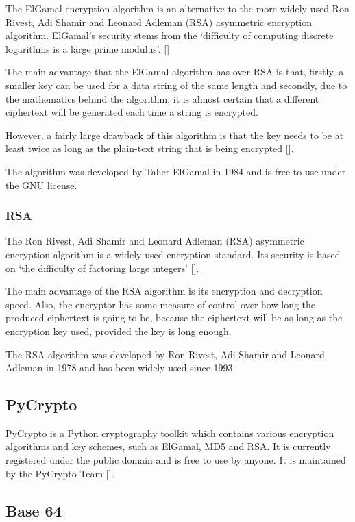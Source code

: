 The ElGamal encryption algorithm is an alternative to the more widely used  Ron Rivest, Adi
Shamir and Leonard Adleman (RSA) asymmetric encryption algorithm. ElGamal's security stems
from the `difficulty of computing discrete logarithms is a large prime modulus'.
[\cite{website:elgamal}]

The main advantage that the ElGamal algorithm has over RSA is that, firstly, a smaller key can
be used for a data string of the same length and secondly, due to the mathematics behind the
algorithm, it is almost certain that a different ciphertext will be generated each time a
string is encrypted.

However, a fairly large drawback of this algorithm is that the key needs to be at least twice
as long as the plain-text string that is being encrypted
[\cite{website:taher-elgamal}].

The algorithm was developed by Taher ElGamal in 1984 and is free to use under the GNU license.

\subsubsection{RSA}
\label{sec:rsa}

The Ron Rivest, Adi Shamir and Leonard Adleman (RSA) asymmetric encryption algorithm is a
widely used encryption standard. Its security is based on `the difficulty of factoring large 
integers' [\cite{website:elgamal}]. 

The main advantage of the RSA algorithm is its encryption and decryption speed. Also, the
encryptor has some measure of control over how long the produced ciphertext is going to be,
because the ciphertext will be as long as the encryption key used, provided the key is long
enough.

The RSA algorithm was developed by Ron Rivest, Adi Shamir and Leonard Adleman in 1978 and has
been widely used since 1993. 

\subsection{PyCrypto}

PyCrypto is a Python cryptography toolkit which contains various encryption algorithms and
key schemes, such as ElGamal, MD5 and RSA. It is currently registered under the public domain
and is free to use by anyone. It is maintained by the PyCrypto Team [\cite{website:pycrypto}].

\subsection{Base 64}

